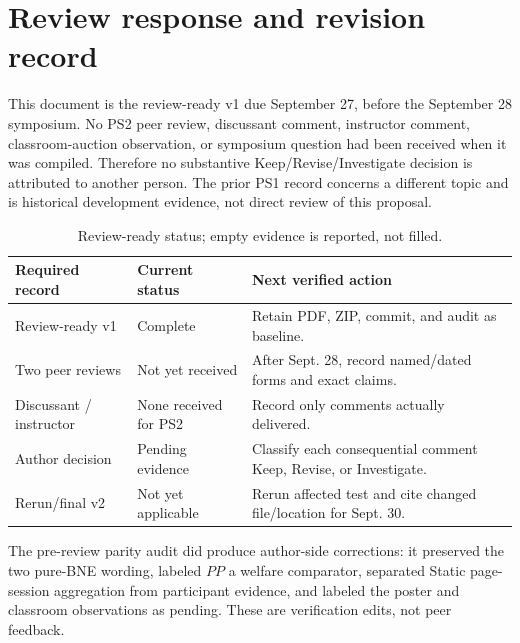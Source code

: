 \newpage
\section{Review response and revision record}
\label{app:review}
This document is the review-ready v1 due September 27, before the September 28 symposium. No PS2 peer review, discussant comment, instructor comment, classroom-auction observation, or symposium question had been received when it was compiled. Therefore no substantive Keep/Revise/Investigate decision is attributed to another person. The prior PS1 record concerns a different topic and is historical development evidence, not direct review of this proposal.

\begin{table}[h]
\caption{Review-ready status; empty evidence is reported, not filled.}
\footnotesize
\begin{tabularx}{\columnwidth}{@{}p{1.55cm}p{1.55cm}Y@{}}\toprule
\textbf{Required record}&\textbf{Current status}&\textbf{Next verified action}\\\midrule
Review-ready v1&Complete&Retain PDF, ZIP, commit, and audit as baseline.\\
Two peer reviews&Not yet received&After Sept. 28, record named/dated forms and exact claims.\\
Discussant / instructor&None received for PS2&Record only comments actually delivered.\\
Author decision&Pending evidence&Classify each consequential comment Keep, Revise, or Investigate.\\
Rerun/final v2&Not yet applicable&Rerun affected test and cite changed file/location for Sept. 30.\\\bottomrule
\end{tabularx}
\end{table}

The pre-review parity audit did produce author-side corrections: it preserved the two pure-BNE wording, labeled $PP$ a welfare comparator, separated Static page-session aggregation from participant evidence, and labeled the poster and classroom observations as pending. These are verification edits, not peer feedback.

\clearpage\onecolumn
